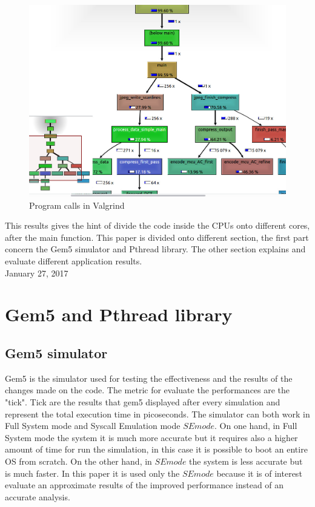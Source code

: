 \documentclass[journal]{IEEEtran}
\begin{document}
\begin{figure}[!h]
	\includegraphics[width=\linewidth]{valgrind}
	\caption{Program calls in Valgrind}
	\label{fig:valgrind}
\end{figure}

This results gives the hint of divide the code inside the CPUs onto different cores, after the main function. This paper is divided onto different section, the first part concern the Gem5 simulator and Pthread library. The other section explains and evaluate different application results.\\

 
\hfill January 27, 2017


\section{Gem5 and Pthread library}
\subsection{Gem5 simulator}
Gem5 is the simulator used for testing the effectiveness and the results of the changes made on the code. The metric for evaluate the performances are the "tick". Tick are the results that gem5 displayed after every simulation and represent the total execution time in picoseconds. 
The simulator can both work in Full System mode and Syscall Emulation mode \(SE mode\). On one hand, in Full System mode the system it is much more accurate but it requires also a higher amount of time for run the simulation, in this case it is possible to boot an entire OS from scratch. On the other hand, in \(SE mode\) the system is less accurate but is much faster.
In this paper it is used only the \(SE mode\) because it is of interest evaluate an approximate results of the improved performance instead of an accurate analysis.
\end{document}
